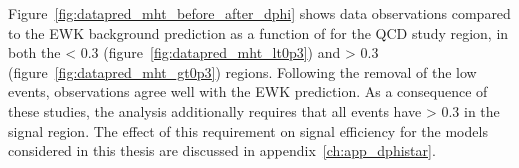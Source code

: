 Figure~\ref{fig:datapred_mht_before_after_dphi} shows data observations
compared to the EWK background prediction as a
function of \mht for the QCD study region, in both the
\mindphistar < 0.3 (figure~\ref{fig:datapred_mht_lt0p3}) and
\mindphistar > 0.3 (figure~\ref{fig:datapred_mht_gt0p3}) regions. Following the
removal of the low \mindphistar events, observations agree well with the EWK
prediction. As a consequence of these studies, the analysis additionally
requires that all
events have \mindphistar > 0.3 in the signal region. The effect of this
requirement on signal efficiency for the models
considered in this thesis are discussed in appendix~\ref{ch:app_dphistar}.










